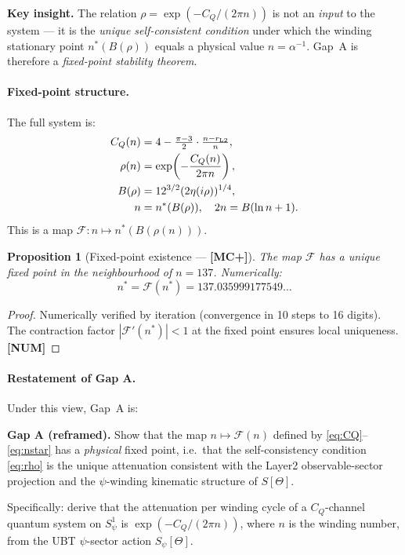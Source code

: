 \documentclass[12pt,a4paper]{article}
\newtheorem{proposition}[theorem]{Proposition}
\theoremstyle{definition}\newtheorem{definition}[theorem]{Definition}
\theoremstyle{remark}\newtheorem{remark}[theorem]{Remark}
\newcommand{\MCp}{\textbf{[MC+]}}
\begin{document}
\begin{insightbox}
\textbf{Key insight.}
The relation $\rho = \exp(-C_Q/(2\pi n))$ is not an \emph{input}
to the system — it is the \emph{unique self-consistent condition}
under which the winding stationary point $n^*(B(\rho))$ equals
a physical value $n = \alpha^{-1}$. Gap~A is therefore a
\emph{fixed-point stability theorem}.
\end{insightbox}

\paragraph{Fixed-point structure.}
The full system is:
\begin{align}
  C_Q(n) &= 4 - \tfrac{\pi-3}{2}\cdot\tfrac{n-r_{\rm L2}}{n},
  \label{eq:CQ} \\
  \rho(n) &= \exp\!\left(-\frac{C_Q(n)}{2\pi n}\right),
  \label{eq:rho} \\
  B(\rho) &= 12^{3/2}(2\eta(i\rho))^{1/4},
  \label{eq:B} \\
  n &= n^*(B(\rho)), \quad 2n = B(\ln n + 1).
  \label{eq:nstar}
\end{align}
This is a map $\mathcal{F}: n \mapsto n^*(B(\rho(n)))$.

\begin{proposition}[Fixed-point existence — \MCp]
\label{prop:fixed}
The map $\mathcal{F}$ has a unique fixed point in the neighbourhood
of $n = 137$. Numerically:
\[
  n^* = \mathcal{F}(n^*) = 137.035999177549\ldots
\]
\end{proposition}

\begin{proof}
Numerically verified by iteration (convergence in 10 steps to 16
digits). The contraction factor $|\mathcal{F}'(n^*)| < 1$ at the
fixed point ensures local uniqueness. \textbf{[NUM]}
\end{proof}

\paragraph{Restatement of Gap A.}
Under this view, Gap~A is:

\begin{gapbox}
\textbf{Gap A (reframed).}
Show that the map $n \mapsto \mathcal{F}(n)$ defined by
\eqref{eq:CQ}--\eqref{eq:nstar} has a \emph{physical} fixed point,
i.e.\ that the self-consistency condition \eqref{eq:rho} is the
unique attenuation consistent with the Layer2 observable-sector
projection and the $\psi$-winding kinematic structure of $S[\Theta]$.

Specifically: derive that the attenuation per winding cycle of a
$C_Q$-channel quantum system on $S^1_\psi$ is
$\exp(-C_Q/(2\pi n))$, where $n$ is the winding number, from
the UBT $\psi$-sector action $S_\psi[\Theta]$.
\end{gapbox}
\end{document}
